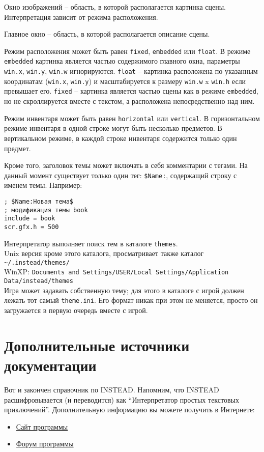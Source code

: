 \documentclass[a4paper,12pt]{article}
\begin{document}
Окно изображений -- область, в которой располагается картинка сцены. Интерпретация зависит от режима расположения.

Главное окно -- область, в которой располагается описание сцены.

Режим расположения может быть равен \verb/fixed/, \verb/embedded/ или \verb/float/. В режиме \verb/embedded/ картинка является частью содержимого главного окна, параметры \verb/win.x/, \verb/win.y/, \verb/win.w/ игнорируются.
\verb/float/ -- картинка расположена по указанным координатам (\verb/win.x/, \verb/win.y/) и масштабируется к размеру \verb/win.w/ x \verb/win.h/ если превышает его.
\verb/fixed/ -- картинка является частью сцены как в режиме \verb/embedded/, но не скроллируется вместе с текстом, а расположена непосредственно над ним.

Режим инвентаря может быть равен \verb/horizontal/ или \verb/vertical/. В горизонтальном режиме инвентаря в одной строке могут быть несколько предметов. В вертикальном режиме, в каждой строке инвентаря содержится только один предмет.

Кроме того, заголовок темы может включать в себя комментарии с тегами. На данный момент существует только один тег: \verb/$Name:/, содержащий строку с именем темы. Например:

\begin{verbatim}
; $Name:Новая тема$
; модификация темы book
include = book
scr.gfx.h = 500
\end{verbatim}

Интерпретатор выполняет поиск тем в каталоге \verb.themes..\\
Unix версия кроме этого каталога, просматривает также каталог \verb;~/.instead/themes/;\\
WinXP: \verb.Documents and Settings/USER/Local Settings/Application Data/instead/themes.\\

Игра может задавать собственную тему; для этого в каталоге с игрой должен лежать тот самый \verb/theme.ini/. Его формат никак при этом не меняется, просто он загружается в первую очередь вместе с игрой.

\section{Дополнительные источники документации}
Вот и закончен справочник по INSTEAD. Напомним, что INSTEAD расшифровывается (и переводится) как ``Интерпретатор простых текстовых приключений''. Дополнительную информацию вы можете получить в Интернете:

\begin{itemize}
\item \href{http://instead.googlecode.com/}{Сайт программы}
\item \href{http://instead.pinebrush.com/}{Форум программы}
\end{itemize}
\end{document}
